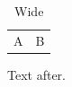 \documentclass{article}
\begin{document}
\begin{table}
\caption{Wide}
\begin{tabular}{ll} A & B \\ \end{tabular}
\end{table}
Text after.
\end{document}
